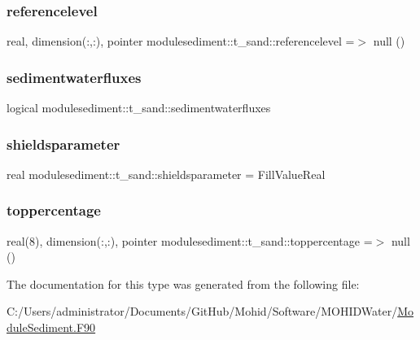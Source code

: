 \subsubsection{\texorpdfstring{referencelevel}{referencelevel}}
{\footnotesize\ttfamily real, dimension(\+:,\+:), pointer modulesediment\+::t\+\_\+sand\+::referencelevel =$>$ null ()\hspace{0.3cm}{\ttfamily [private]}}

\mbox{\label{structmodulesediment_1_1t__sand_a7b400e1df88ffff77611d3e4e4d41608}} 
\subsubsection{\texorpdfstring{sedimentwaterfluxes}{sedimentwaterfluxes}}
{\footnotesize\ttfamily logical modulesediment\+::t\+\_\+sand\+::sedimentwaterfluxes\hspace{0.3cm}{\ttfamily [private]}}

\mbox{\label{structmodulesediment_1_1t__sand_a3e31efd986fcbd1aa1cd65e72eb5d6f4}} 
\subsubsection{\texorpdfstring{shieldsparameter}{shieldsparameter}}
{\footnotesize\ttfamily real modulesediment\+::t\+\_\+sand\+::shieldsparameter = Fill\+Value\+Real\hspace{0.3cm}{\ttfamily [private]}}

\mbox{\label{structmodulesediment_1_1t__sand_a4a19a9ce76d539fb943641e390d17d80}} 
\subsubsection{\texorpdfstring{toppercentage}{toppercentage}}
{\footnotesize\ttfamily real(8), dimension(\+:,\+:), pointer modulesediment\+::t\+\_\+sand\+::toppercentage =$>$ null ()\hspace{0.3cm}{\ttfamily [private]}}



The documentation for this type was generated from the following file\+:\begin{DoxyCompactItemize}
\item 
C\+:/\+Users/administrator/\+Documents/\+Git\+Hub/\+Mohid/\+Software/\+M\+O\+H\+I\+D\+Water/\mbox{\hyperlink{_module_sediment_8_f90}{Module\+Sediment.\+F90}}\end{DoxyCompactItemize}
